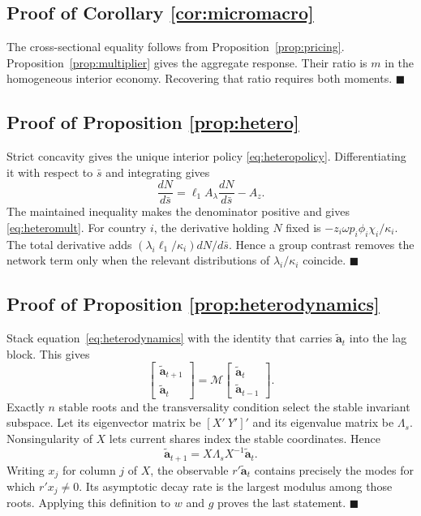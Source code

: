 \documentclass[11pt]{article}
\theoremstyle{definition}
\begin{document}
\subsection{Proof of Corollary \ref{cor:micromacro}}
The cross-sectional equality follows from Proposition~\ref{prop:pricing}. Proposition~\ref{prop:multiplier} gives the aggregate response. Their ratio is $m$ in the homogeneous interior economy. Recovering that ratio requires both moments. $\blacksquare$

\subsection{Proof of Proposition \ref{prop:hetero}}
Strict concavity gives the unique interior policy \eqref{eq:heteropolicy}. Differentiating it with respect to $\bar s$ and integrating gives
\[
\frac{dN}{d\bar s}=\ell_1A_\lambda\frac{dN}{d\bar s}-A_z.
\]
The maintained inequality makes the denominator positive and gives \eqref{eq:heteromult}. For country $i$, the derivative holding $N$ fixed is $-z_i\omega p_i\phi_i\chi_i/\kappa_i$. The total derivative adds $(\lambda_i\ell_1/\kappa_i)dN/d\bar s$. Hence a group contrast removes the network term only when the relevant distributions of $\lambda_i/\kappa_i$ coincide. $\blacksquare$

\subsection{Proof of Proposition \ref{prop:heterodynamics}}
Stack equation~\eqref{eq:heterodynamics} with the identity that carries $\widetilde{\mathbf a}_t$ into the lag block. This gives
\[
\begin{bmatrix}
\widetilde{\mathbf a}_{t+1}\\
\widetilde{\mathbf a}_t
\end{bmatrix}
=\mathcal M
\begin{bmatrix}
\widetilde{\mathbf a}_t\\
\widetilde{\mathbf a}_{t-1}
\end{bmatrix}.
\]
Exactly $n$ stable roots and the transversality condition select the stable invariant subspace. Let its eigenvector matrix be $[X'\ Y']'$ and its eigenvalue matrix be $\Lambda_s$. Nonsingularity of $X$ lets current shares index the stable coordinates. Hence
\[
\widetilde{\mathbf a}_{t+1}
=X\Lambda_sX^{-1}\widetilde{\mathbf a}_t.
\]
Writing $x_j$ for column $j$ of $X$, the observable $r'\widetilde{\mathbf a}_t$ contains precisely the modes for which $r'x_j\neq0$. Its asymptotic decay rate is the largest modulus among those roots. Applying this definition to $w$ and $g$ proves the last statement. $\blacksquare$
\end{document}
